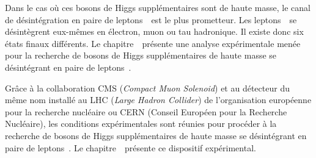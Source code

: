 \par Dans le cas où ces bosons de Higgs supplémentaires sont de haute masse, le canal de désintégration en paire de leptons~\tau\ est le plus prometteur.
Les leptons~\tau\ se désintègrent eux-mêmes en électron, muon ou tau hadronique.
Il existe donc six états finaux différents.
Le chapitre~\ présente une analyse expérimentale menée pour la recherche de bosons de Higgs supplémentaires de haute masse se désintégrant en paire de leptons~\tau.
\par Grâce à la collaboration CMS (\emph{Compact Muon Solenoid}) et au détecteur du même nom installé au LHC (\emph{Large Hadron Collider}) de l'organisation européenne pour la recherche nucléaire ou CERN (Conseil Européen pour la Recherche Nucléaire), les conditions expérimentales sont réunies pour procéder à la
recherche de bosons de Higgs supplémentaires de haute masse se désintégrant en paire de leptons~\tau.
Le chapitre~\ présente ce dispositif expérimental.
